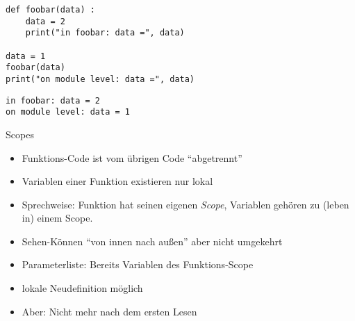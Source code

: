 \begin{frame}[fragile]
\begin{tcolorbox}[title=Speicherbild]
\begin{center}
\end{center}
\end{tcolorbox}
%
\end{frame}


\begin{frame}[fragile]
%
\begin{codebox}
\begin{verbatim}
def foobar(data) :
    data = 2
    print("in foobar: data =", data)

data = 1
foobar(data)
print("on module level: data =", data)
\end{verbatim}
\end{codebox}

\begin{cmdbox}
\begin{verbatim}
in foobar: data = 2
on module level: data = 1
\end{verbatim}
\end{cmdbox}
%
\end{frame}


\begin{frame}{Scopes}
%
\begin{itemize}
\item Funktions-Code ist vom übrigen Code \enquote{abgetrennt}
\item Variablen einer Funktion existieren nur lokal
\item Sprechweise: Funktion hat seinen eigenen \emph{Scope}, Variablen gehören zu (leben in) einem Scope.
\item Sehen-Können \enquote{von innen nach außen} aber nicht umgekehrt
\item Parameterliste: Bereits Variablen des Funktions-Scope
\item lokale Neudefinition möglich
\item Aber: Nicht mehr nach dem ersten Lesen
\end{itemize}
%
\end{frame}


